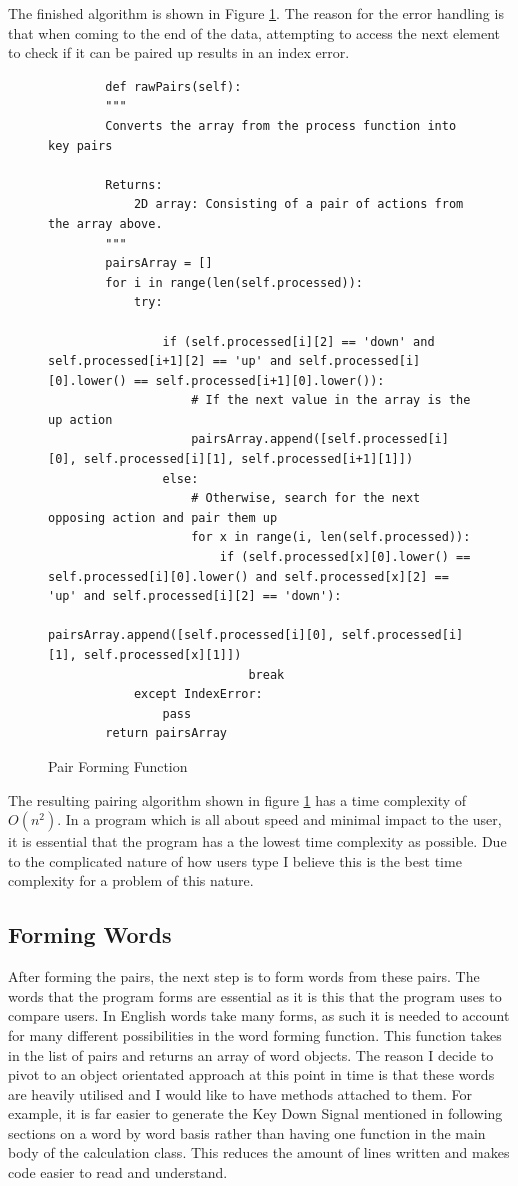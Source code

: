 \documentclass[10pt,a4paper]{report}
\begin{document}
The finished algorithm is shown in Figure \ref{fig:PairForm}. The reason for the error handling is that when coming to the end of the data, attempting to access the next element to check if it can be paired up results in an index error.
\begin{figure}[h!]
	\begin{lstlisting}
		def rawPairs(self):
        """
        Converts the array from the process function into key pairs

        Returns:
            2D array: Consisting of a pair of actions from the array above.
        """
        pairsArray = []
        for i in range(len(self.processed)):
            try:
                
                if (self.processed[i][2] == 'down' and self.processed[i+1][2] == 'up' and self.processed[i][0].lower() == self.processed[i+1][0].lower()):
                    # If the next value in the array is the up action
                    pairsArray.append([self.processed[i][0], self.processed[i][1], self.processed[i+1][1]])
                else:
                    # Otherwise, search for the next opposing action and pair them up
                    for x in range(i, len(self.processed)):
                        if (self.processed[x][0].lower() == self.processed[i][0].lower() and self.processed[x][2] == 'up' and self.processed[i][2] == 'down'):
                            pairsArray.append([self.processed[i][0], self.processed[i][1], self.processed[x][1]])
                            break        
            except IndexError:
                pass
        return pairsArray
	\end{lstlisting}
	\caption{Pair Forming Function}
	\label{fig:PairForm}
\end{figure}

The resulting pairing algorithm shown in figure \ref{fig:PairForm} has a time complexity of \(O(n^2)\). In a program which is all about speed and minimal impact to the user, it is essential that the program has a the lowest time complexity as possible. Due to the complicated nature of how users type I believe this is the best time complexity for a problem of this nature.

\subsection{Forming Words}

After forming the pairs, the next step is to form words from these pairs. The words that the program forms are essential as it is this that the program uses to compare users. In English words take many forms, as such it is needed to account for many different possibilities in the word forming function. This function takes in the list of pairs and returns an array of word objects. The reason I decide to pivot to an object orientated approach at this point in time is that these words are heavily utilised and I would like to have methods attached to them. For example, it is far easier to generate the Key Down Signal mentioned in following sections on a word by word basis rather than having one function in the main body of the calculation class. This reduces the amount of lines written and makes code easier to read and understand.
\end{document}
